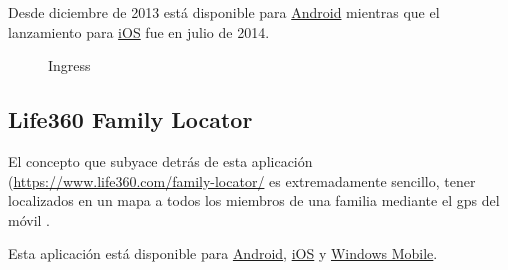 Desde diciembre de 2013 está disponible para \href{https://play.google.com/store/apps/details?id=com.nianticproject.ingress}{Android} mientras que el lanzamiento para \href{https://itunes.apple.com/us/app/ingress/id576505181?mt=8}{iOS} fue en julio de 2014.

\begin{figure}[h!btp]
	\begin{adjustbox}{minipage=\linewidth, fbox}
		\centering
		\hspace{10mm}
	\end{adjustbox}
\caption{Ingress}
	\label{fig:ingress}
\end{figure}

\subsection{Life360 Family Locator}
El concepto que subyace detrás de esta aplicación (\url{https://www.life360.com/family-locator/} es extremadamente sencillo, tener localizados en un mapa a todos los miembros de una familia mediante el gps del móvil \cite{Unk13}.

Esta aplicación está disponible para \href{https://play.google.com/store/apps/details?id=com.life360.android.safetymapd}{Android}, \href{https://itunes.apple.com/us/app/life360-locator/id384830320?mt=8}{iOS} y \href{https://www.microsoft.com/es-es/store/apps/life360-family-locator/9wzdncrfj0gw}{Windows Mobile}.


